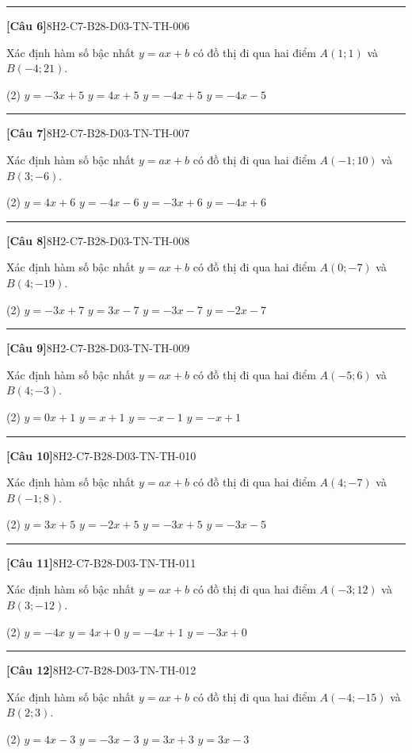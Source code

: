 \documentclass[12pt,a4paper]{article}
\newif\ifloigiai
\newenvironment{cauhoi}[2]{%
  \par\medskip\noindent\rule{\textwidth}{0.4pt}\par\nopagebreak
  \noindent\textbf{[#1]}\hfill{\scriptsize\ttfamily #2}\par\nopagebreak\smallskip}{\par}
\newcommand{\dapan}[1]{\ifloigiai\par\smallskip\noindent\textit{Đáp án:} \textbf{#1}\par\fi}
\begin{document}
\begin{cauhoi}{Câu 6}{8H2-C7-B28-D03-TN-TH-006}
Xác định hàm số bậc nhất $y=ax+b$ có đồ thị đi qua hai điểm $A(1;1)$ và $B(-4;21)$.
\begin{tasks}(2)
\task $y=-3x+5$
\task $y=4x+5$
\task $y=-4x+5$
\task $y=-4x-5$
\end{tasks}
\dapan{C}
\end{cauhoi}
\begin{cauhoi}{Câu 7}{8H2-C7-B28-D03-TN-TH-007}
Xác định hàm số bậc nhất $y=ax+b$ có đồ thị đi qua hai điểm $A(-1;10)$ và $B(3;-6)$.
\begin{tasks}(2)
\task $y=4x+6$
\task $y=-4x-6$
\task $y=-3x+6$
\task $y=-4x+6$
\end{tasks}
\dapan{D}
\end{cauhoi}
\begin{cauhoi}{Câu 8}{8H2-C7-B28-D03-TN-TH-008}
Xác định hàm số bậc nhất $y=ax+b$ có đồ thị đi qua hai điểm $A(0;-7)$ và $B(4;-19)$.
\begin{tasks}(2)
\task $y=-3x+7$
\task $y=3x-7$
\task $y=-3x-7$
\task $y=-2x-7$
\end{tasks}
\dapan{C}
\end{cauhoi}
\begin{cauhoi}{Câu 9}{8H2-C7-B28-D03-TN-TH-009}
Xác định hàm số bậc nhất $y=ax+b$ có đồ thị đi qua hai điểm $A(-5;6)$ và $B(4;-3)$.
\begin{tasks}(2)
\task $y=0x+1$
\task $y=x+1$
\task $y=-x-1$
\task $y=-x+1$
\end{tasks}
\dapan{D}
\end{cauhoi}
\begin{cauhoi}{Câu 10}{8H2-C7-B28-D03-TN-TH-010}
Xác định hàm số bậc nhất $y=ax+b$ có đồ thị đi qua hai điểm $A(4;-7)$ và $B(-1;8)$.
\begin{tasks}(2)
\task $y=3x+5$
\task $y=-2x+5$
\task $y=-3x+5$
\task $y=-3x-5$
\end{tasks}
\dapan{C}
\end{cauhoi}
\begin{cauhoi}{Câu 11}{8H2-C7-B28-D03-TN-TH-011}
Xác định hàm số bậc nhất $y=ax+b$ có đồ thị đi qua hai điểm $A(-3;12)$ và $B(3;-12)$.
\begin{tasks}(2)
\task $y=-4x$
\task $y=4x+0$
\task $y=-4x+1$
\task $y=-3x+0$
\end{tasks}
\dapan{A}
\end{cauhoi}
\begin{cauhoi}{Câu 12}{8H2-C7-B28-D03-TN-TH-012}
Xác định hàm số bậc nhất $y=ax+b$ có đồ thị đi qua hai điểm $A(-4;-15)$ và $B(2;3)$.
\begin{tasks}(2)
\task $y=4x-3$
\task $y=-3x-3$
\task $y=3x+3$
\task $y=3x-3$
\end{tasks}
\dapan{D}
\end{cauhoi}
\end{document}
